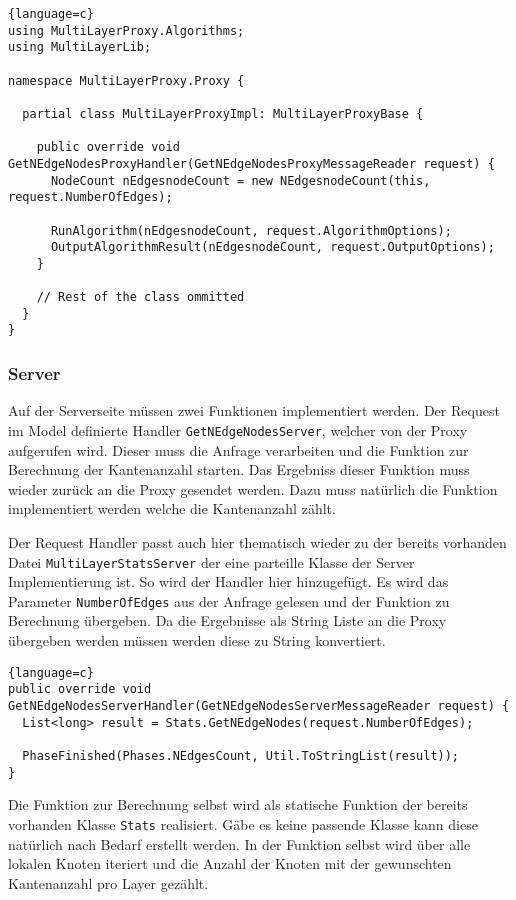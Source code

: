 \begin{lstlisting}{language=c}
using MultiLayerProxy.Algorithms;
using MultiLayerLib;

namespace MultiLayerProxy.Proxy {

  partial class MultiLayerProxyImpl: MultiLayerProxyBase {

    public override void GetNEdgeNodesProxyHandler(GetNEdgeNodesProxyMessageReader request) {
      NodeCount nEdgesnodeCount = new NEdgesnodeCount(this, request.NumberOfEdges);

      RunAlgorithm(nEdgesnodeCount, request.AlgorithmOptions);
      OutputAlgorithmResult(nEdgesnodeCount, request.OutputOptions);
    }
  
    // Rest of the class ommitted
  }
}
\end{lstlisting}



\subsubsection{Server}

Auf der Serverseite müssen zwei Funktionen implementiert werden. Der Request im Model definierte Handler \verb|GetNEdgeNodesServer|, welcher von der Proxy aufgerufen wird. Dieser muss die Anfrage verarbeiten und die Funktion zur Berechnung der Kantenanzahl starten. Das Ergebniss dieser Funktion muss wieder zurück an die Proxy gesendet werden.
Dazu muss natürlich die Funktion implementiert werden welche die Kantenanzahl zählt.

Der Request Handler passt auch hier thematisch wieder zu der bereits vorhanden Datei \verb|MultiLayerStatsServer| der eine parteille Klasse der Server Implementierung ist. So wird der Handler hier hinzugefügt.
Es wird das Parameter \verb|NumberOfEdges| aus der Anfrage gelesen und der Funktion zu Berechnung übergeben. Da die Ergebnisse als String Liste an die Proxy übergeben werden müssen werden diese zu String konvertiert.


\begin{lstlisting}{language=c}
public override void GetNEdgeNodesServerHandler(GetNEdgeNodesServerMessageReader request) {
  List<long> result = Stats.GetNEdgeNodes(request.NumberOfEdges);

  PhaseFinished(Phases.NEdgesCount, Util.ToStringList(result));
}
\end{lstlisting}

Die Funktion zur Berechnung selbst wird als statische Funktion der bereits vorhanden Klasse \verb|Stats| realisiert. Gäbe es keine passende Klasse kann diese natürlich nach Bedarf erstellt werden.
In der Funktion selbst wird über alle lokalen Knoten iteriert und die Anzahl der Knoten mit der gewunschten Kantenanzahl pro Layer gezählt. 

